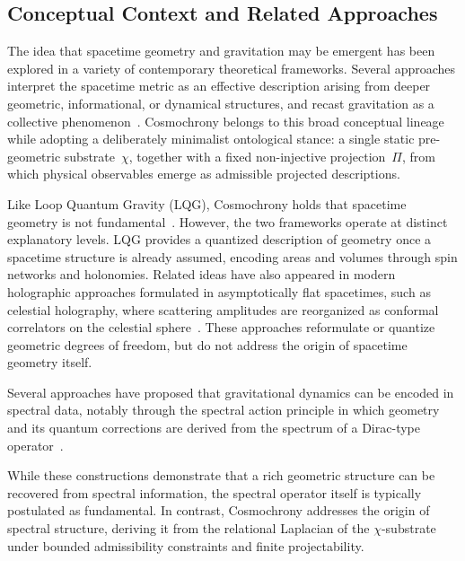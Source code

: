 \subsection{Conceptual Context and Related Approaches}
  \label{subsec:conceptual-context-and-related-approaches}

  The idea that spacetime geometry and gravitation may be emergent has been
  explored in a variety of contemporary theoretical frameworks.
  Several approaches interpret the spacetime metric as an effective description
  arising from deeper geometric, informational, or dynamical structures, and
  recast gravitation as a collective phenomenon~\cite{Nye2024,Singh2025}.
  Cosmochrony belongs to this broad conceptual lineage while adopting a
  deliberately minimalist ontological stance: a single static pre-geometric
  substrate~$\chi$, together with a fixed non-injective projection~$\Pi$,
  from which physical observables emerge as admissible projected descriptions.

  Like Loop Quantum Gravity (LQG), Cosmochrony holds that spacetime geometry is
  not fundamental~\cite{Rovelli2004}.
  However, the two frameworks operate at distinct explanatory levels.
  LQG provides a quantized description of geometry once a spacetime structure is
  already assumed, encoding areas and volumes through spin networks and
  holonomies.
  Related ideas have also appeared in modern holographic approaches formulated in
  asymptotically flat spacetimes, such as celestial holography, where scattering
  amplitudes are reorganized as conformal correlators on the celestial
  sphere~\cite{StromingerInfraredLectures}.
  These approaches reformulate or quantize geometric degrees of freedom, but do
  not address the origin of spacetime geometry itself.

  Several approaches have proposed that gravitational dynamics can be encoded
  in spectral data, notably through the spectral action principle in which
  geometry and its quantum corrections are derived from the spectrum of a
  Dirac-type operator~\cite{ChamseddineConnes1997,Halfyorov2026}.

  While these constructions demonstrate that a rich geometric structure can be
  recovered from spectral information, the spectral operator itself is typically
  postulated as fundamental.
  In contrast, Cosmochrony addresses the origin of spectral structure, deriving
  it from the relational Laplacian of the $\chi$-substrate under bounded
  admissibility constraints and finite projectability.

